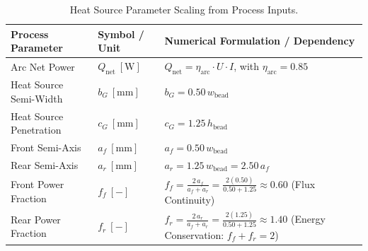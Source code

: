 \documentclass[10pt,a4paper]{article}
\begin{document}
\begin{table}[h!]
\centering
\small
\caption{Heat Source Parameter Scaling from Process Inputs.}
\label{tab:heatsource_matrix}
\vspace{0.4em}
\begin{tabularx}{\textwidth}{p{4.2cm} p{2.2cm} X}
\toprule
\textbf{Process Parameter} & \textbf{Symbol / Unit} & \textbf{Numerical Formulation / Dependency} \\
\midrule
Arc Net Power & $Q_{\mathrm{net}}\ [\mathrm{W}]$ & $Q_{\mathrm{net}} = \eta_{\mathrm{arc}} \cdot U \cdot I$, with $\eta_{\mathrm{arc}} = 0.85$ \\
\addlinespace[0.2em]
Heat Source Semi-Width & $b_G\ [\mathrm{mm}]$ & $b_G = 0.50\,w_{\mathrm{bead}}$ \\
\addlinespace[0.2em]
Heat Source Penetration & $c_G\ [\mathrm{mm}]$ & $c_G = 1.25\,h_{\mathrm{bead}}$ \\
\addlinespace[0.2em]
Front Semi-Axis & $a_f\ [\mathrm{mm}]$ & $a_f = 0.50\,w_{\mathrm{bead}}$ \\
\addlinespace[0.2em]
Rear Semi-Axis & $a_r\ [\mathrm{mm}]$ & $a_r = 1.25\,w_{\mathrm{bead}} = 2.50\,a_f$ \\
\addlinespace[0.2em]
Front Power Fraction & $f_f\ [-]$ & $f_f = \frac{2\,a_f}{a_f + a_r} = \frac{2(0.50)}{0.50 + 1.25} \approx 0.60$ (Flux Continuity) \\
\addlinespace[0.2em]
Rear Power Fraction & $f_r\ [-]$ & $f_r = \frac{2\,a_r}{a_f + a_r} = \frac{2(1.25)}{0.50 + 1.25} \approx 1.40$ (Energy Conservation: $f_f + f_r = 2$) \\
\bottomrule
\end{tabularx}
\end{table}
\end{document}
